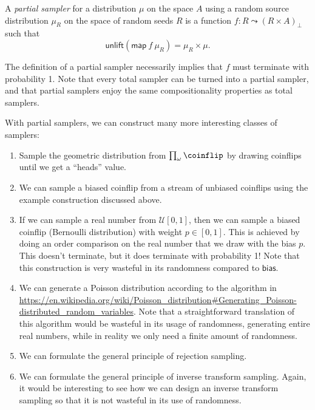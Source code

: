\begin{definition}
A \emph{partial sampler} for a distribution $\mu$ on the space $A$ using a random source distribution $\mu_R$ on the space of random seeds $R$ is a function $ f : R \leadsto \left(R \times A \right)_\bot$ such that
\[
 \mathsf{unlift}\left(\mathsf{map}\ f \ \mu_R\right) = \mu_R \times \mu.
\]
\end{definition}

The definition of a partial sampler necessarily implies that $f$ must terminate with probability 1. Note that every total sampler can be turned into a partial sampler, and that partial samplers enjoy the same compositionality properties as total samplers.

With partial samplers, we can construct many more interesting classes of samplers:

\begin{enumerate}
\item Sample the geometric distribution from $\prod_\omega \coinflip$ by drawing coinflips until we get a ``heads'' value.
\item We can sample a biased coinflip from a stream of unbiased coinflips using the example construction discussed above.
\item If we can sample a real number from $\mathcal{U}[0,1]$, then we can sample a biased coinflip (Bernoulli distribution) with weight $p \in [0,1]$. This is achieved by doing an order comparison on the real number that we draw with the bias $p$. This doesn't terminate, but it does terminate with probability 1! Note that this construction is very wasteful in its randomness compared to $\mathsf{bias}$.
\item We can generate a Poisson distribution according to the algorithm in \url{https://en.wikipedia.org/wiki/Poisson_distribution#Generating_Poisson-distributed_random_variables}. Note that a straightforward translation of this algorithm would be wasteful in its usage of randomness, generating entire real numbers, while in reality we only need a finite amount of randomness.
\item We can formulate the general principle of rejection sampling.
\item We can formulate the general principle of inverse transform sampling. Again, it would be interesting to see how we can design an inverse transform sampling so that it is not wasteful in its use of randomness.
\end{enumerate}